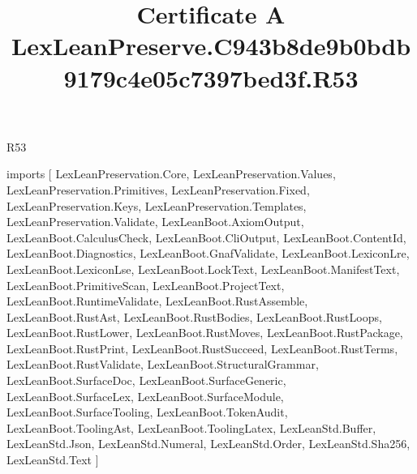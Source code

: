 \begin{lexlean}{R53}
\title{Certificate A LexLeanPreserve.C943b8de9b0bdb9179c4e05c7397bed3f.R53}
\begin{coremodule}
imports [
  LexLeanPreservation.Core,
  LexLeanPreservation.Values,
  LexLeanPreservation.Primitives,
  LexLeanPreservation.Fixed,
  LexLeanPreservation.Keys,
  LexLeanPreservation.Templates,
  LexLeanPreservation.Validate,
  LexLeanBoot.AxiomOutput,
  LexLeanBoot.CalculusCheck,
  LexLeanBoot.CliOutput,
  LexLeanBoot.ContentId,
  LexLeanBoot.Diagnostics,
  LexLeanBoot.GnafValidate,
  LexLeanBoot.LexiconLre,
  LexLeanBoot.LexiconLse,
  LexLeanBoot.LockText,
  LexLeanBoot.ManifestText,
  LexLeanBoot.PrimitiveScan,
  LexLeanBoot.ProjectText,
  LexLeanBoot.RuntimeValidate,
  LexLeanBoot.RustAssemble,
  LexLeanBoot.RustAst,
  LexLeanBoot.RustBodies,
  LexLeanBoot.RustLoops,
  LexLeanBoot.RustLower,
  LexLeanBoot.RustMoves,
  LexLeanBoot.RustPackage,
  LexLeanBoot.RustPrint,
  LexLeanBoot.RustSucceed,
  LexLeanBoot.RustTerms,
  LexLeanBoot.RustValidate,
  LexLeanBoot.StructuralGrammar,
  LexLeanBoot.SurfaceDoc,
  LexLeanBoot.SurfaceGeneric,
  LexLeanBoot.SurfaceLex,
  LexLeanBoot.SurfaceModule,
  LexLeanBoot.SurfaceTooling,
  LexLeanBoot.TokenAudit,
  LexLeanBoot.ToolingAst,
  LexLeanBoot.ToolingLatex,
  LexLeanStd.Buffer,
  LexLeanStd.Json,
  LexLeanStd.Numeral,
  LexLeanStd.Order,
  LexLeanStd.Sha256,
  LexLeanStd.Text
]


\end{coremodule}
\end{lexlean}
